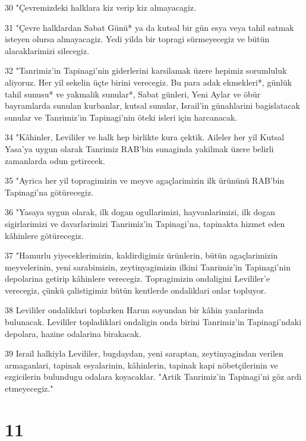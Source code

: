 \par 30 "Çevremizdeki halklara kiz verip kiz almayacagiz.
\par 31 "Çevre halklardan Sabat Günü* ya da kutsal bir gün esya veya tahil satmak isteyen olursa almayacagiz. Yedi yilda bir topragi sürmeyecegiz ve bütün alacaklarimizi silecegiz.
\par 32 "Tanrimiz'in Tapinagi'nin giderlerini karsilamak üzere hepimiz sorumluluk aliyoruz. Her yil sekelin üçte birini verecegiz. Bu para adak ekmekleri*, günlük tahil sunusu* ve yakmalik sunular*, Sabat günleri, Yeni Aylar ve öbür bayramlarda sunulan kurbanlar, kutsal sunular, Israil'in günahlarini bagislatacak sunular ve Tanrimiz'in Tapinagi'nin öteki isleri için harcanacak.
\par 34 "Kâhinler, Levililer ve halk hep birlikte kura çektik. Aileler her yil Kutsal Yasa'ya uygun olarak Tanrimiz RAB'bin sunaginda yakilmak üzere belirli zamanlarda odun getirecek.
\par 35 "Ayrica her yil topragimizin ve meyve agaçlarimizin ilk ürününü RAB'bin Tapinagi'na götürecegiz.
\par 36 "Yasaya uygun olarak, ilk dogan ogullarimizi, hayvanlarimizi, ilk dogan sigirlarimizi ve davarlarimizi Tanrimiz'in Tapinagi'na, tapinakta hizmet eden kâhinlere götürecegiz.
\par 37 "Hamurlu yiyeceklerimizin, kaldirdigimiz ürünlerin, bütün agaçlarimizin meyvelerinin, yeni sarabimizin, zeytinyagimizin ilkini Tanrimiz'in Tapinagi'nin depolarina getirip kâhinlere verecegiz. Topragimizin ondaligini Levililer'e verecegiz, çünkü çalistigimiz bütün kentlerde ondaliklari onlar topluyor.
\par 38 Levililer ondaliklari toplarken Harun soyundan bir kâhin yanlarinda bulunacak. Levililer topladiklari ondaligin onda birini Tanrimiz'in Tapinagi'ndaki depolara, hazine odalarina birakacak.
\par 39 Israil halkiyla Levililer, bugdaydan, yeni saraptan, zeytinyagindan verilen armaganlari, tapinak esyalarinin, kâhinlerin, tapinak kapi nöbetçilerinin ve ezgicilerin bulundugu odalara koyacaklar. "Artik Tanrimiz'in Tapinagi'ni göz ardi etmeyecegiz."

\chapter{11}

